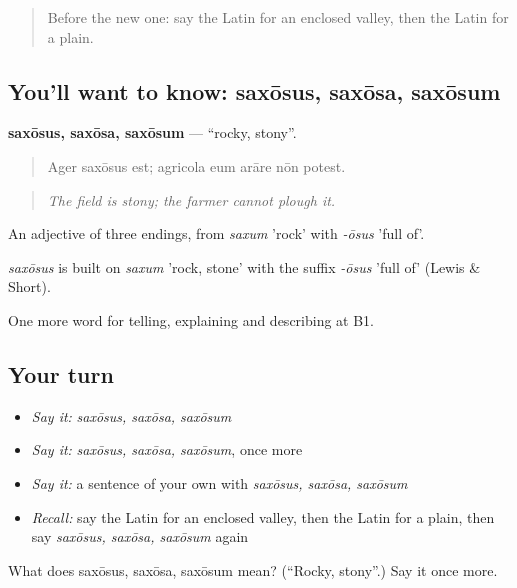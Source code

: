 \begin{quote}
Before the new one: say the Latin for an enclosed valley, then the Latin for a plain.
\end{quote}

\subsection*{You'll want to know: saxōsus, saxōsa, saxōsum}
\textbf{saxōsus, saxōsa, saxōsum} — \textquotedblleft{}rocky, stony\textquotedblright{}.

\begin{quote}
Ager saxōsus est; agricola eum arāre nōn potest.
\end{quote}

\begin{quote}
\emph{The field is stony; the farmer cannot plough it.}
\end{quote}

An adjective of three endings, from \emph{saxum} 'rock' with \emph{-ōsus} 'full of'.

\begin{cousinweb}
\emph{saxōsus} is built on \emph{saxum} 'rock, stone' with the suffix \emph{-ōsus} 'full of' (Lewis \& Short).
\end{cousinweb}

\begin{grammarlens}[title={What you've built}]
One more word for telling, explaining and describing at B1.
\end{grammarlens}

\subsection*{Your turn}
\begin{itemize}
\raggedright
  \item \emph{Say it:} \emph{saxōsus, saxōsa, saxōsum}
  \item \emph{Say it:} \emph{saxōsus, saxōsa, saxōsum}, once more
  \item \emph{Say it:} a sentence of your own with \emph{saxōsus, saxōsa, saxōsum}
  \item \emph{Recall:} say the Latin for an enclosed valley, then the Latin for a plain, then say \emph{saxōsus, saxōsa, saxōsum} again
\end{itemize}

\begin{tcolorbox}[breakable,colback=teal!4,colframe=teal!35!black,title={Before you move on}]
What does saxōsus, saxōsa, saxōsum mean? (\textquotedblleft{}Rocky, stony\textquotedblright{}.) Say it once more.
\end{tcolorbox}

